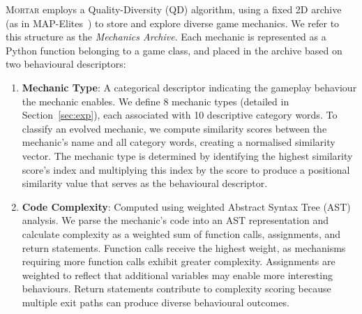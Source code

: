 \documentclass{article} %
\newcommand{\name}{\textsc{Mortar}}
\begin{document}
\name{} employs a Quality-Diversity (QD) algorithm, using a fixed 2D archive (as in MAP-Elites~\citep{mouret2015illuminating}) to store and explore diverse game mechanics. We refer to this structure as the \textit{Mechanics Archive}. Each mechanic is represented as a Python function belonging to a game class, and placed in the archive based on two behavioural descriptors:

\begin{enumerate}
    \item \textbf{Mechanic Type}: A categorical descriptor indicating the gameplay behaviour the mechanic enables. We define 8 mechanic types (detailed in Section~\ref{sec:exp}), each associated with 10 descriptive category words. To classify an evolved mechanic, we compute similarity scores between the mechanic's name and all category words, creating a normalised similarity vector. The mechanic type is determined by identifying the highest similarity score's index and multiplying this index by the score to produce a positional similarity value that serves as the behavioural descriptor.

    \item \textbf{Code Complexity}: Computed using weighted Abstract Syntax Tree (AST) analysis. We parse the mechanic's code into an AST representation and calculate complexity as a weighted sum of function calls, assignments, and return statements. Function calls receive the highest weight, as mechanisms requiring more function calls exhibit greater complexity. Assignments are weighted to reflect that additional variables may enable more interesting behaviours. Return statements contribute to complexity scoring because multiple exit paths can produce diverse behavioural outcomes.

\end{enumerate}

\end{document}
